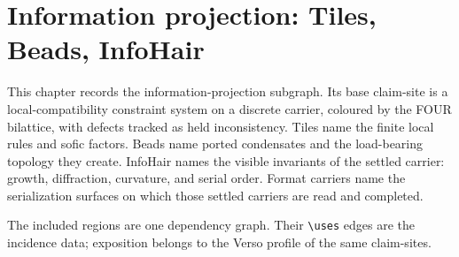 \chapter{Information projection: Tiles, Beads, InfoHair}\label{ch:textile}

This chapter records the information-projection subgraph.  Its base claim-site is a
local-compatibility constraint system on a discrete carrier, coloured by the FOUR
bilattice, with defects tracked as held inconsistency.  Tiles name the finite
local rules and sofic factors.  Beads name ported condensates and the
load-bearing topology they create.  InfoHair names the visible invariants of the
settled carrier: growth, diffraction, curvature, and serial order.  Format
carriers name the serialization surfaces on which those settled carriers are
read and completed.

The included regions are one dependency graph.  Their
\texttt{\textbackslash uses} edges are the incidence data; exposition belongs to the
Verso profile of the same claim-sites.





